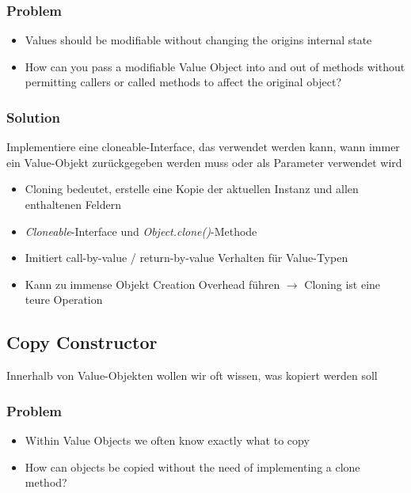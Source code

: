 \subsubsection{Problem}
\begin{itemize}
    \item Values should be modifiable without changing the origins internal state
    \item How can you pass a modifiable Value Object into and out of methods without permitting callers or called methods to affect the original object?
\end{itemize}

\subsubsection{Solution}
Implementiere eine cloneable-Interface, das verwendet werden kann, wann immer ein Value-Objekt zurückgegeben werden muss oder als Parameter verwendet wird

\begin{itemize}
    \item Cloning bedeutet, erstelle eine Kopie der aktuellen Instanz und allen enthaltenen Feldern
    \item \textit{Cloneable}-Interface und \textit{Object.clone()}-Methode
    \item Imitiert call-by-value / return-by-value Verhalten für Value-Typen
    \item Kann zu immense Objekt Creation Overhead führen $\rightarrow$ Cloning ist eine teure Operation
\end{itemize}

\subsection{Copy Constructor}

Innerhalb von Value-Objekten wollen wir oft wissen, was kopiert werden soll

\subsubsection{Problem}
\begin{itemize}
    \item Within Value Objects we often know exactly what to copy
    \item How can objects be copied without the need of implementing a clone method?
\end{itemize}

